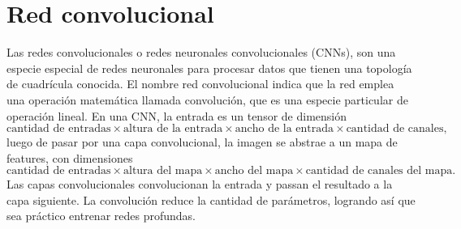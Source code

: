 \documentclass[12pt,a4paper]{article}
\begin{document}
\section{Red convolucional}
Las redes convolucionales o redes neuronales convolucionales (CNNs), son una especie especial de redes neuronales para procesar datos que tienen una topología de cuadrícula conocida.
El nombre red convolucional indica que la red emplea una operación matemática llamada convolución, que es una especie particular de operación lineal.
En una CNN, la entrada es un tensor de dimensión
$$
\text{cantidad de entradas} \times \text{altura de la entrada} \times \text{ancho de la entrada} \times \text{cantidad de canales},
$$
luego de pasar por una capa convolucional, la imagen se abstrae a un mapa de features, con dimensiones
$$
\text{cantidad de entradas} \times \text{altura del mapa} \times \text{ancho del mapa} \times \text{cantidad de canales del mapa}.
$$
Las capas convolucionales convolucionan la entrada y passan el resultado a la capa siguiente. La convolución reduce la cantidad de parámetros, logrando así que sea práctico entrenar redes profundas.\\
\end{document}
